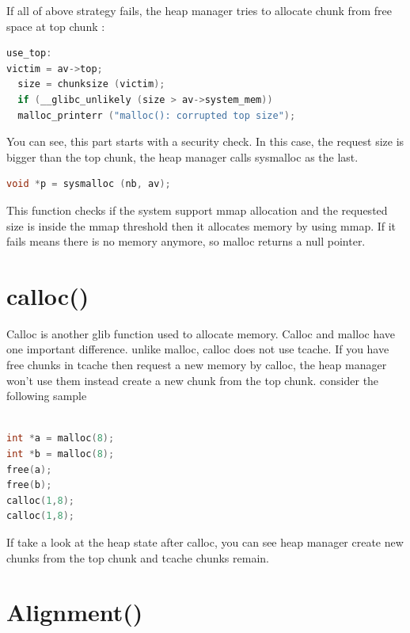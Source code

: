 \documentclass{masterthesis}
\newcommand*\tch{tcache}
\begin{document}
If all of above strategy fails, the heap manager tries to allocate chunk from free space at top chunk :
\begin{lstlisting}[language=c,frame=tlrb]
use_top:
victim = av->top;
  size = chunksize (victim);
  if (__glibc_unlikely (size > av->system_mem))
  malloc_printerr ("malloc(): corrupted top size");
\end{lstlisting}
You can see, this part starts with a security check. In this case, the request size is bigger than the top chunk, the heap manager calls sysmalloc as the last.
\begin{lstlisting}[language=c,frame=tlrb]
 void *p = sysmalloc (nb, av);
 \end{lstlisting}
This function checks if the system support mmap allocation and the requested size is inside the mmap threshold then it allocates memory by using mmap. If it fails means there is no memory anymore, so malloc returns a null pointer.
\section{calloc()}
Calloc is another glib function used to allocate memory. Calloc and malloc have one important difference. unlike malloc, calloc does not use \tch{}. If you have free chunks in \tch{} then request a new memory by calloc, the heap manager won't use them instead create a new chunk from the top chunk. consider the following sample 
\begin{lstlisting}[language=c,frame=tlrb]

int *a = malloc(8);
int *b = malloc(8);
free(a);
free(b);
calloc(1,8);
calloc(1,8);
\end{lstlisting}
If take a look at the heap state after calloc, you can see heap manager create new chunks from the top chunk and tcache chunks remain.

\section{Alignment()}
\end{document}
